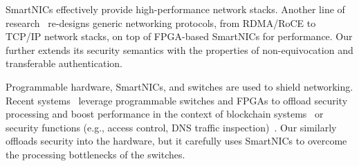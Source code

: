  SmartNICs effectively provide high-performance network stacks. Another line of research~\cite{coyote, corundum, storm, 8891991, 280712, 9114811, opennic_project} re-designs generic networking protocols, from RDMA/RoCE to TCP/IP network stacks, on top of FPGA-based SmartNICs for performance. Our \projecttitle{} further extends its security semantics with the properties of non-equivocation and transferable authentication. 

 Programmable hardware, SmartNICs, and switches are used to shield networking. Recent systems~\cite{10.1145/3603269.3604874, 10.1145/3620678.3624786, 10.1145/3563647.3563654, 10.1145/3321408.3323087, 278292} leverage programmable switches and FPGAs to offload security processing and boost performance in the context of blockchain systems~\cite{10.1145/3603269.3604874} or security functions (e.g., access control, DNS traffic inspection)~\cite{10.1145/3620678.3624786, 10.1145/3563647.3563654, 10.1145/3321408.3323087}. Our \projecttitle{} similarly offloads security into the hardware, but it carefully uses SmartNICs to overcome the processing bottlenecks of the switches. 






